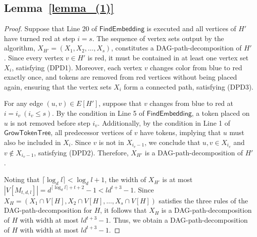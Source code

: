 \documentclass[runningheads]{llncs}
\theoremstyle{plain}
\theoremstyle{definition}
\begin{document}
\subsection{\textbf{Lemma~\ref{lemma_(1)}}}\label{appendix_D4}
\begin{proof}
    Suppose that Line 20 of $\mathsf{FindEmbedding}$ is executed and all vertices of $H'$ have turned red at step $i=s$.
    The sequence of vertex sets output by the algorithm, $X_{H'} = (X_1, X_2, \dots , X_s)$, constitutes a DAG-path-decomposition of $H'$. Since every vertex $v \in H'$ is red, it must be contained in at least one vertex set $X_i$, satisfying (DPD1). Moreover, each vertex $v$ changes color from blue to red exactly once, and tokens are removed from red vertices without being placed again, ensuring that the vertex sets $X_i$ form a connected path, satisfying (DPD3).

    For any edge $(u, v) \in E[H']$, suppose that $v$ changes from blue to red at $i=i_v~ (i_v \leq s)$. By the condition in Line 5 of $\mathsf{FindEmbedding}$, a token placed on $u$ is not removed before step $i_v$. Additionally, by the condition in Line 1 of $\mathsf{GrowTokenTree}$, all predecessor vertices of $v$ have tokens, implying that $u$ must also be included in $X_i$. Since $v$ is not in $X_{i_v-1}$, we conclude that $u, v \in X_{i_v}$ and $v \notin X_{i_v-1}$, satisfying (DPD2). Therefore, $X_{H'}$ is a DAG-path-decomposition of $H'$.

    Noting that $\lceil \log_d l \rceil < \log_d l +1$, the width of $X_{H'}$ is at most $|V[M_{t, d, l}]| = d^{\lceil \log_d l \rceil +t+2}-1 < ld^{t+3}-1$. Since $X_H = (X_1 \cap V[H], X_2 \cap V[H], \dots , X_s \cap V[H])$ satisfies the three rules of the DAG-path-decomposition for $H$, it follows that $X_H$ is a DAG-path-decomposition of $H$ with width at most $ld^{t+3}-1$. Thus, we obtain a DAG-path-decomposition of $H$ with width at most $ld^{t+3}-1$.
\end{proof}
\end{document}
